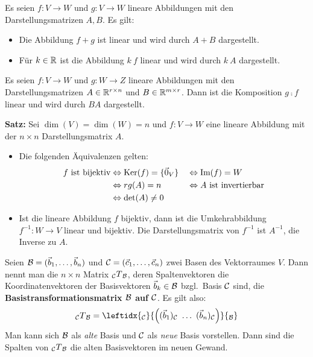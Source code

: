 
Es seien $f: V \rightarrow W$ und $g: V \rightarrow W$ lineare Abbildungen mit den Darstellungsmatrizen $A, B$.
Es gilt:
\begin{itemize}
    \item Die Abbildung $f + g$ ist linear und wird durch $A + B$ dargestellt.
    \item Für $k \in \mathbb{R}$ ist die Abbildung $k \ f$ linear und wird durch $k \ A$ dargestellt.
\end{itemize}

Es seien $f: V \rightarrow W$ und $g: W \rightarrow Z$ lineare Abbildungen mit den Darstellungsmatrizen $A \in \mathbb{R}^{r \times n}$ und $B \in \mathbb{R}^{m \times r}$.
Dann ist die Komposition $g \comp f$ linear und wird durch $BA$ dargestellt.

\textbf{Satz:} Sei $\dim(V) = \dim(W) = n$ und $f: V \rightarrow W$ eine lineare Abbildung mit der $n \times n$ Darstellungsmatrix $A$.
\begin{itemize}
    \item Die folgenden Äquivalenzen gelten:
    \begin{alignat*}{2}
        f \text{ ist bijektiv} &\Leftrightarrow \text{Ker}(f) = \{ \vec{0}_V \} &&\Leftrightarrow \text{Im}(f) = W \\ &\Leftrightarrow rg(A) = n &&\Leftrightarrow A \text{ ist invertierbar} \\
        &\Leftrightarrow \det(A) \neq 0
    \end{alignat*}
    \item Ist die lineare Abbildung $f$ bijektiv, dann ist die Umkehrabbildung $f^{-1}: W \rightarrow V$ linear und bijektiv.
    Die Darstellungsmatrix von $f^{-1}$ ist $A^{-1}$, die Inverse zu $A$.
\end{itemize}


Seien $\mathcal{B} = (\vec{b}_1, \dots, \vec{b}_n)$ und $\mathcal{C} = (\vec{c}_1, \dots, \vec{c}_n)$ zwei Basen des Vektorraumes $V$.
Dann nennt man die $n \times n$ Matrix ${_{\mathcal{C}}}T{_{\mathcal{B}}}$, deren Spaltenvektoren die Koordinatenvektoren der Basisvektoren $\vec{b}_k \in \mathcal{B}$ bzgl.\ Basis $\mathcal{C}$ sind, die \textbf{Basistransformationsmatrix $\mathcal{B}$ auf $\mathcal{C}$}.
Es gilt also:
\[{_\C}T{_\B} = \leftidx{_\C}{\left( (\vec{b}_1)_\C \ \dots \ (\vec{b}_n)_\C \right)}{_\B} \]
Man kann sich $\mathcal{B}$ als \emph{alte} Basis und $\mathcal{C}$ als \emph{neue} Basis vorstellen.
Dann sind die Spalten von ${_{\mathcal{C}}}T{_{\mathcal{B}}}$ die alten Basisvektoren im neuen Gewand.

